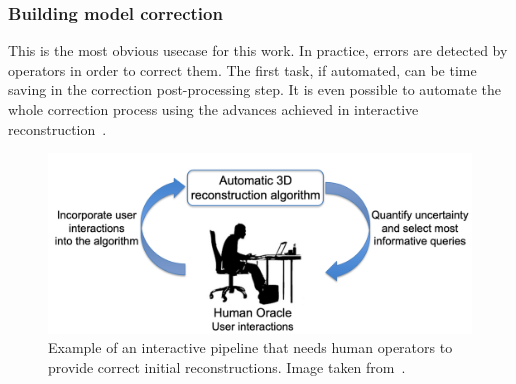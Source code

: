         \subsubsection{Building model correction}
            This is the most obvious usecase for this work.
            In practice, errors are detected by operators in order to correct them.
            The first task, if automated, can be time saving in the correction post-processing step.
            It is even possible to automate the whole correction process using the advances achieved in interactive reconstruction~\parencite{kowdle2011active}.
            \begin{figure}[htpb]
                \centering
                \includegraphics[width=.7\textwidth]{images/introduction/use/active_learning_kowdle}
                \caption[
                    Example of an interactive pipeline that needs human operators to provide correct initial reconstructions.
                ]{
                    \label{fig::corrections}
                    Example of an interactive pipeline that needs human operators to provide correct initial reconstructions.
                    Image taken from~\parencite{kowdle2011active}.
                }
            \end{figure}

